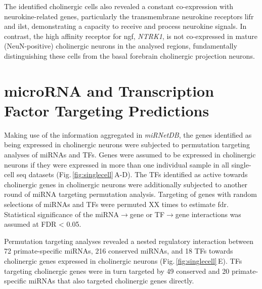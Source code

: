 The identified cholinergic cells also revealed a constant co-expression with neurokine-related genes, particularly the transmembrane neurokine receptors \ac{lifr} and \ac{ilst}, demonstrating a capacity to receive and process neurokine signals. In contrast, the high affinity receptor for \ac{ngf}, \textit{NTRK1}, is not co-expressed in mature (NeuN-positive) cholinergic neurons in the analysed regions, fundamentally distinguishing these cells from the basal forebrain cholinergic projection neurons.

\section{microRNA and Transcription Factor Targeting Predictions}
\begin{method}
Making use of the information aggregated in \emph{miRNetDB}, the genes identified as being expressed in cholinergic neurons were subjected to permutation targeting analyses of miRNAs and TFs. Genes were assumed to be expressed in cholinergic neurons if they were expressed in more than one individual sample in all single-cell \ac{seq} datasets (Fig.\,\ref{fig:singlecell}\,A-D). The TFs identified as active towards cholinergic genes in cholinergic neurons were additionally subjected to another round of miRNA targeting permutation analysis. Targeting of genes with random selections of miRNAs and TFs were permuted XX times to estimate \ac{fdr}. Statistical significance of the miRNA$\to$gene or TF$\to$gene interactions was assumed at FDR < 0.05.
\end{method}

Permutation targeting analyses revealed a nested regulatory interaction between 72 primate-specific miRNAs, 216 conserved miRNAs, and 18 TFs towards cholinergic genes expressed in cholinergic neurons (Fig.\,\ref{fig:singlecell}\,E). TFs targeting cholinergic genes were in turn targeted by 49 conserved and 20 primate-specific miRNAs that also targeted cholinergic genes directly.

